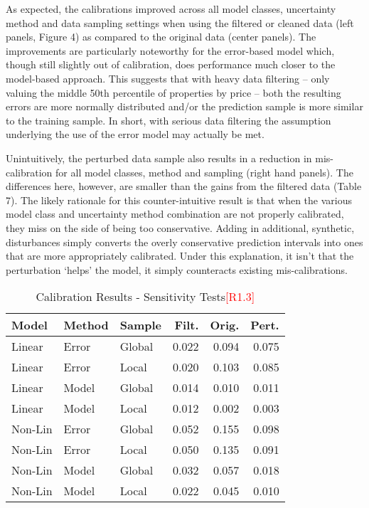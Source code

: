\documentclass[colTwo]{anon}
\theoremstyle{definition}
\begin{document}
As expected, the calibrations improved across all model classes, uncertainty method and data sampling settings when using the filtered or cleaned data (left panels, Figure 4) as compared to the original data (center panels).  The improvements are particularly noteworthy for the error-based model which, though still slightly out of calibration, does performance much closer to the model-based approach. This suggests that with heavy data filtering -- only valuing the middle 50th percentile of properties by price -- both the resulting errors are more normally distributed and/or the prediction sample is more similar to the training sample.  In short, with serious data filtering the assumption underlying the use of the error model may actually be met.

Unintuitively, the perturbed data sample also results in a reduction in mis-calibration for all model classes, method and sampling (right hand panels).  The differences here, however, are smaller than the gains from the filtered data (Table 7).  The likely rationale for this counter-intuitive result is that when the various model class and uncertainty method combination are not properly calibrated, they miss on the side of being too conservative.  Adding in additional, synthetic, disturbances simply converts the overly conservative prediction intervals into ones that are more appropriately calibrated.  Under this explanation, it isn’t that the perturbation ‘helps’ the model, it simply counteracts existing mis-calibrations.  

\begin{table}[h]
\centering
\begin{tabular}{l|l|l|r|r|r}
\hline
\textbf{Model} & \textbf{Method} & \textbf{Sample} & \textbf{Filt.} & \textbf{Orig.} & \textbf{Pert.}\\
\hline
Linear & Error & Global & 0.022 & 0.094 & 0.075\\
Linear & Error & Local & 0.020 & 0.103 & 0.085\\
\hline
Linear & Model & Global & 0.014 & 0.010 & 0.011\\
Linear & Model & Local & 0.012 & 0.002 & 0.003\\
\hline
Non-Lin & Error & Global & 0.052 & 0.155 & 0.098\\
Non-Lin & Error & Local & 0.050 & 0.135 & 0.091\\
\hline
Non-Lin & Model & Global & 0.032 & 0.057 & 0.018\\
Non-Lin & Model & Local & 0.022 & 0.045 & 0.010\\
\hline
\end{tabular}
\caption{Calibration Results - Sensitivity Tests\textcolor{red}{[R1.3]}}
\label{table:calibsens}
\end{table}
\end{document}
